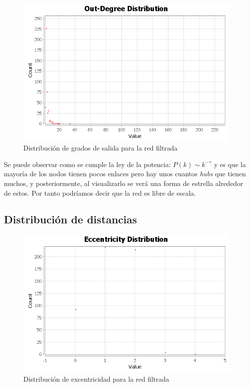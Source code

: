 \begin{figure}[H]
	\centering
	\includegraphics[width=12cm]{img/out-degree-distribution-filtered}
	\caption{Distribución de grados de salida para la red filtrada}
	\label{fig:out-degree-distribution-filtered}
\end{figure}

Se puede observar como se cumple la ley de la potencia: $ P(k) \sim k^{-\gamma} $ y es que la mayoría de los nodos tienen pocos enlaces pero hay unos cuantos \textit{hubs} que tienen muchos, y posteriormente, al visualizarlo se verá una forma de estrella alrededor de estos. Por tanto podríamos decir que la red es libre de escala.

\subsection{Distribución de distancias}

\begin{figure}[H]
	\centering
	\includegraphics[width=12cm]{img/eccentricity-distribution-filtered}
	\caption{Distribución de excentricidad para la red filtrada}
	\label{fig:eccentricity-distribution-filtered}
\end{figure}

